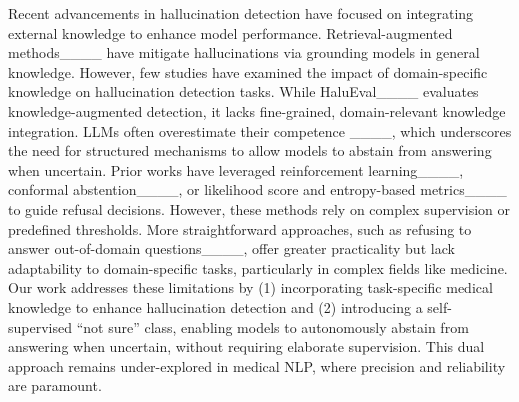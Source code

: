 Recent advancements in hallucination detection have focused on integrating external knowledge to enhance model performance. Retrieval-augmented methods____ have mitigate hallucinations via grounding models in general knowledge. However, few studies have examined the impact of domain-specific knowledge on hallucination detection tasks. While HaluEval____ evaluates knowledge-augmented detection, it lacks fine-grained, domain-relevant knowledge integration. LLMs often overestimate their competence ____, which underscores the need for structured mechanisms to allow models to abstain from answering when uncertain. Prior works have leveraged reinforcement learning____, conformal abstention____, or likelihood score and entropy-based metrics____ to guide refusal decisions. However, these methods rely on complex supervision or predefined thresholds. More straightforward approaches, such as refusing to answer out-of-domain questions____, offer greater practicality but lack adaptability to domain-specific tasks, particularly in complex fields like medicine. Our work addresses these limitations by (1) incorporating task-specific medical knowledge to enhance hallucination detection and (2) introducing a self-supervised “not sure” class, enabling models to autonomously abstain from answering when uncertain, without requiring elaborate supervision. This dual approach remains under-explored in medical NLP, where precision and reliability are paramount.

\vspace{-3mm}